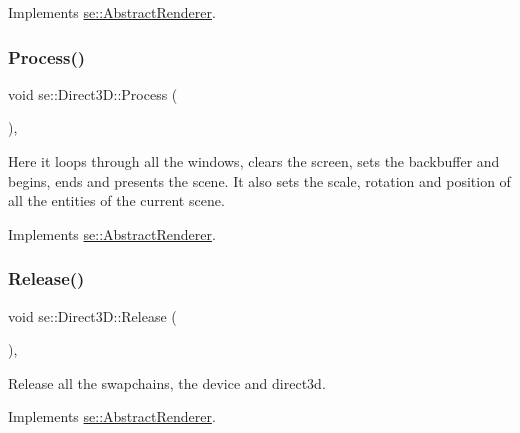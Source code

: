 Implements \mbox{\hyperlink{classse_1_1_abstract_renderer_afd7697df1d4958ec3b0fa13109a269a1}{se\+::\+Abstract\+Renderer}}.

\mbox{\label{classse_1_1_direct3_d_aa87e49a2704cc5da20655ce41ae9782b}} 
\subsubsection{\texorpdfstring{Process()}{Process()}}
{\footnotesize\ttfamily void se\+::\+Direct3\+D\+::\+Process (\begin{DoxyParamCaption}{ }\end{DoxyParamCaption})\hspace{0.3cm}{\ttfamily [override]}, {\ttfamily [virtual]}}

Here it loops through all the windows, clears the screen, sets the backbuffer and begins, ends and presents the scene. It also sets the scale, rotation and position of all the entities of the current scene. 

Implements \mbox{\hyperlink{classse_1_1_abstract_renderer_a90596b2d067b4fa197b809191407be97}{se\+::\+Abstract\+Renderer}}.

\mbox{\label{classse_1_1_direct3_d_ae2979f16a5c35773cf2c243d8e6f90e4}} 
\subsubsection{\texorpdfstring{Release()}{Release()}\hspace{0.1cm}{\footnotesize\ttfamily [1/2]}}
{\footnotesize\ttfamily void se\+::\+Direct3\+D\+::\+Release (\begin{DoxyParamCaption}{ }\end{DoxyParamCaption})\hspace{0.3cm}{\ttfamily [override]}, {\ttfamily [virtual]}}

Release all the swapchains, the device and direct3d. 

Implements \mbox{\hyperlink{classse_1_1_abstract_renderer_a98e35b7db62827580573185ed91b25bb}{se\+::\+Abstract\+Renderer}}.

\mbox{\label{classse_1_1_direct3_d_a77f814cda45f2b490e11c522f8e752e3}} 
